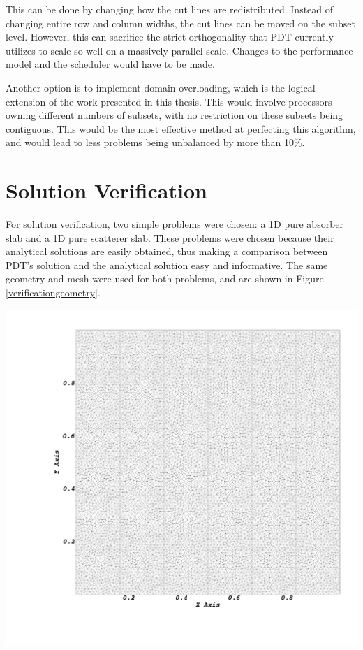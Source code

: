 This can be done by changing how the cut lines are redistributed. Instead of changing entire row and column widths, the cut lines can be moved on the subset level. However, this can sacrifice the strict orthogonality that PDT currently utilizes to scale so well on a massively parallel scale. Changes to the performance model and the scheduler would have to be made.

Another option is to implement domain overloading, which is the logical extension of the work presented in this thesis. This would involve processors owning different numbers of subsets, with no restriction on these subsets being contiguous. This would be the most effective method at perfecting this algorithm, and would lead to less problems being unbalanced by more than 10\%.

\section{Solution Verification}

For solution verification, two simple problems were chosen: a 1D pure absorber slab and a 1D pure scatterer slab. These problems were chosen because their analytical solutions are easily obtained, thus making a comparison between PDT's solution and the analytical solution easy and informative. The same geometry and mesh were used for both problems, and are shown in Figure \ref{verificationgeometry}.

\noindent\begin{minipage}{\textwidth}
\centering
\includegraphics[scale = 0.12,trim = 10cm 10cm 0cm 0cm ]{figures/solutionmesh.png}
\label{verificationgeometry}
\end{minipage}
\smallskip

